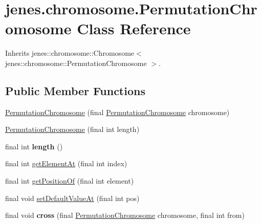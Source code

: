 \hypertarget{classjenes_1_1chromosome_1_1_permutation_chromosome}{
\section{jenes.chromosome.PermutationChromosome Class Reference}
\label{classjenes_1_1chromosome_1_1_permutation_chromosome}
}
Inherits jenes::chromosome::Chromosome$<$ jenes::chromosome::PermutationChromosome $>$.

\subsection*{Public Member Functions}
\begin{CompactItemize}
\item 
\hyperlink{classjenes_1_1chromosome_1_1_permutation_chromosome_10cdd7769af8702d9b367b1a7a17214d}{PermutationChromosome} (final \hyperlink{classjenes_1_1chromosome_1_1_permutation_chromosome}{PermutationChromosome} chromosome)
\item 
\hyperlink{classjenes_1_1chromosome_1_1_permutation_chromosome_7c3b4e904d419c51af512f1f82faa109}{PermutationChromosome} (final int length)
\item 
\hypertarget{classjenes_1_1chromosome_1_1_permutation_chromosome_bbdf232b2c833492472f1c487c23fadd}{
final int \textbf{length} ()}
\label{classjenes_1_1chromosome_1_1_permutation_chromosome_bbdf232b2c833492472f1c487c23fadd}

\item 
final int \hyperlink{classjenes_1_1chromosome_1_1_permutation_chromosome_8c2aee80f46c4634d6797a346a6560cc}{getElementAt} (final int index)
\item 
final int \hyperlink{classjenes_1_1chromosome_1_1_permutation_chromosome_0c8a75c9417def5db8724d22aadf0303}{getPositionOf} (final int element)
\item 
final void \hyperlink{classjenes_1_1chromosome_1_1_permutation_chromosome_10210f11733f4d94e2743112179a2bf6}{setDefaultValueAt} (final int pos)
\item 
\hypertarget{classjenes_1_1chromosome_1_1_permutation_chromosome_3fda59734f77c447518e49086f7be0c2}{
final void \textbf{cross} (final \hyperlink{classjenes_1_1chromosome_1_1_permutation_chromosome}{PermutationChromosome} chromosome, final int from)}
\label{classjenes_1_1chromosome_1_1_permutation_chromosome_3fda59734f77c447518e49086f7be0c2}


\end{CompactItemize}
